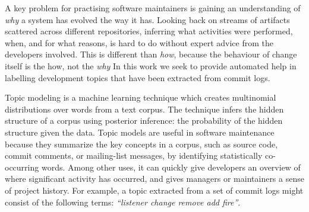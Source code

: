 \documentclass[]{sig-alternate}
\begin{document}



A key problem for practising software maintainers is gaining an
understanding of \emph{why} a system has evolved the way it has. 
Looking back on streams of artifacts scattered across different
repositories, inferring what activities were performed, when, and for
what reasons, is hard to do without expert advice from the developers
involved. 
This is different than \emph{how}, because the behaviour of change itself is the
how, not the \emph{why}
In this work we seek to provide automated help in labelling development topics that have been extracted from commit logs.

Topic modeling is a machine learning technique which creates
multinomial distributions over words from a text corpus. 
The technique infers the hidden structure of a corpus using posterior
inference: the probability of the hidden structure given the data. 
Topic models are useful in software maintenance because they summarize
the key concepts in a corpus, such as source code, commit comments, or
mailing-list messages, by identifying statistically co-occurring words. 
Among other uses, it can quickly give developers an overview of where significant
activity has occurred, and gives managers or maintainers a sense of
project history. 
For example, a topic extracted from a set of commit logs might consist of the following terms: \emph{ ``listener change remove add fire''}. 
\end{document}
